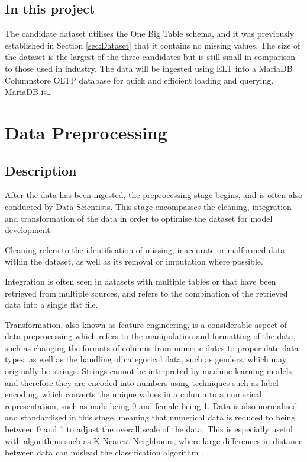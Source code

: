 \documentclass[12pt]{report}
\begin{document}
\subsection{In this project}
The candidate dataset utilises the One Big Table schema, and it was previously established in Section \ref{sec:Dataset}
that it contains no missing values. The size of the dataset is the largest of the three candidates but is still
small in comparison to those used in industry. The data will be ingested using ELT into a MariaDB Columnstore 
OLTP database for quick and efficient loading and querying. MariaDB is\dots




\section{Data Preprocessing}
\subsection{Description}
After the data has been ingested, the preprocessing stage begins, and is often also conducted by 
Data Scientists. This stage encompasses the 
cleaning, integration and transformation of the data in order to optimise the dataset for model development.

Cleaning refers to the identification of missing, inaccurate or malformed data within the dataset,
as well as its removal or imputation where possible.

Integration is often seen in datasets with multiple tables or that have been retrieved from multiple sources,
and refers to the combination of the retrieved data into a single flat file. 

Transformation, also known as feature engineering, is a considerable aspect of data preprocessing
which refers to the manipulation and formatting of the data, such as changing the formats of columns 
from numeric dates to proper date data types, as well as the handling of categorical data, such as genders, 
which may originally be strings. Strings cannot be interpreted by machine learning models, and therefore they 
are encoded into numbers using techniques such as label encoding, which converts the unique values in a column
to a numerical representation, such as male being 0 and female being 1. Data is also normalised and standardised 
in this stage, meaning that numerical data is reduced to being between 0 and 1 to adjust the overall scale of the 
data. This is especially useful with algorithms such as K-Nearest Neighbours, where large differences in distance 
between data can mislead the classification algorithm \autocite{ibm_what_2021}.
\end{document}
